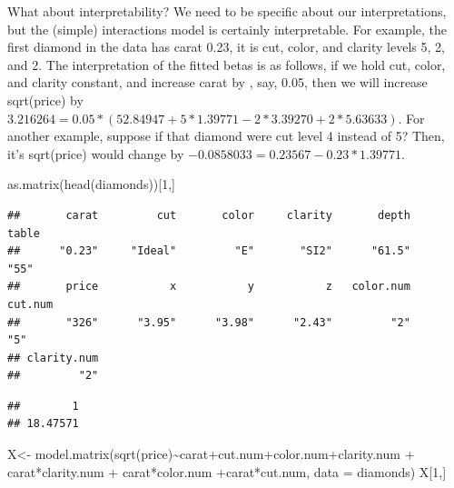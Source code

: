 \documentclass[
]{book}
\newenvironment{Shaded}{\begin{snugshade}}{\end{snugshade}}
\newcommand{\AttributeTok}[1]{\textcolor[rgb]{0.77,0.63,0.00}{#1}}
\newcommand{\DecValTok}[1]{\textcolor[rgb]{0.00,0.00,0.81}{#1}}
\newcommand{\FunctionTok}[1]{\textcolor[rgb]{0.00,0.00,0.00}{#1}}
\newcommand{\NormalTok}[1]{#1}
\newcommand{\OtherTok}[1]{\textcolor[rgb]{0.56,0.35,0.01}{#1}}
\newcommand{\SpecialCharTok}[1]{\textcolor[rgb]{0.00,0.00,0.00}{#1}}
\begin{document}
What about interpretability? We need to be specific about our interpretations, but the (simple) interactions model is certainly interpretable. For example, the first diamond in the data has carat 0.23, it is cut, color, and clarity levels 5, 2, and 2. The interpretation of the fitted betas is as follows, if we hold cut, color, and clarity constant, and increase carat by , say, 0.05, then we will increase sqrt(price) by \(3.216264 = 0.05*(52.84947 + 5*1.39771 -2*3.39270+2*5.63633)\). For another example, suppose if that diamond were cut level 4 instead of 5? Then, it's sqrt(price) would change by \(-0.0858033 = 0.23567 - 0.23*1.39771\).

\begin{Shaded}
\begin{Highlighting}[]
\FunctionTok{as.matrix}\NormalTok{(}\FunctionTok{head}\NormalTok{(diamonds))[}\DecValTok{1}\NormalTok{,]}
\end{Highlighting}
\end{Shaded}

\begin{verbatim}
##       carat         cut       color     clarity       depth       table 
##      "0.23"     "Ideal"         "E"       "SI2"      "61.5"        "55" 
##       price           x           y           z   color.num     cut.num 
##       "326"      "3.95"      "3.98"      "2.43"         "2"         "5" 
## clarity.num 
##         "2"
\end{verbatim}

\begin{Shaded}
\end{Shaded}

\begin{verbatim}
##        1 
## 18.47571
\end{verbatim}

\begin{Shaded}
\begin{Highlighting}[]
\NormalTok{X}\OtherTok{\textless{}{-}} \FunctionTok{model.matrix}\NormalTok{(}\FunctionTok{sqrt}\NormalTok{(price)}\SpecialCharTok{\textasciitilde{}}\NormalTok{carat}\SpecialCharTok{+}\NormalTok{cut.num}\SpecialCharTok{+}\NormalTok{color.num}\SpecialCharTok{+}\NormalTok{clarity.num }\SpecialCharTok{+}\NormalTok{ carat}\SpecialCharTok{*}\NormalTok{clarity.num }\SpecialCharTok{+}\NormalTok{ carat}\SpecialCharTok{*}\NormalTok{color.num }\SpecialCharTok{+}\NormalTok{carat}\SpecialCharTok{*}\NormalTok{cut.num, }\AttributeTok{data =}\NormalTok{ diamonds)}
\NormalTok{X[}\DecValTok{1}\NormalTok{,]}
\end{Highlighting}
\end{Shaded}
\end{document}
